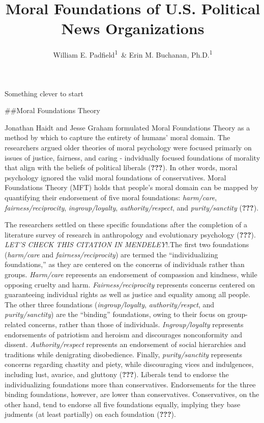 \documentclass[,man]{apa6}
\title{Moral Foundations of U.S. Political News Organizations}
\author{William E. Padfield\textsuperscript{1}~\& Erin M. Buchanan,
Ph.D.\textsuperscript{1}}
\date{}
\affiliation{
\vspace{0.5cm}
\textsuperscript{1} Missouri State University}
\theoremstyle{definition}
\theoremstyle{definition}
\theoremstyle{definition}
\theoremstyle{remark}
\begin{document}
\maketitle

Something clever to start

\#\#Moral Foundations Theory

Jonathan Haidt and Jesse Graham formulated Moral Foundations Theory as a
method by which to capture the entirety of humans' moral domain. The
researchers argued older theories of moral psychology were focused
primarly on issues of justice, fairness, and caring - indvidually
focused foundations of morality that align with the beliefs of political
liberals ({\textbf{???}}). In other words, moral psychology ignored the
valid moral foundations of conservatives. Moral Foundations Theory (MFT)
holds that people's moral domain can be mapped by quantifying their
endorsement of five moral foundations: \emph{harm/care},
\emph{fairness/reciprocity}, \emph{ingroup/loyalty},
\emph{authority/respect}, and \emph{purity/sanctity} ({\textbf{???}}).

The researchers settled on these specific foundations after the
completion of a literature survey of research in anthropology and
evolutionary psychology ({\textbf{???}}). \emph{LET'S CHECK THIS
CITATION IN MENDELEY}!.The first two foundations (\emph{harm/care} and
\emph{fairness/reciprocity}) are termed the \enquote{individualizing
foundations,} as they are centered on the concerns of individuals rather
than groups. \emph{Harm/care} represents an endorsement of compassion
and kindness, while opposing cruelty and harm.
\emph{Fairness/reciprocity} represents concerns centered on guaranteeing
individual rights as well as justice and equality among all people. The
other three foundations (\emph{ingroup/loyalty},
\emph{authority/respct}, and \emph{purity/sanctity}) are the
\enquote{binding} foundations, owing to their focus on group-related
concerns, rather than those of individuals. \emph{Ingroup/loyalty}
represents endorsements of patriotism and heroism and discourages
nonconformity and dissent. \emph{Authority/respect} represents an
endorsement of social hierarchies and traditions while denigrating
disobedience. Finally, \emph{purity/sanctity} represents concerns
regarding chastity and piety, while discouraging vices and indulgences,
including lust, avarice, and gluttony ({\textbf{???}}). Liberals tend to
endorse the individualizing foundations more than conservatives.
Endorsements for the three binding foundations, however, are lower than
conservatives. Conservatives, on the other hand, tend to endorse all
five foundations equally, implying they base judments (at least
partially) on each foundation ({\textbf{???}}).
\end{document}
